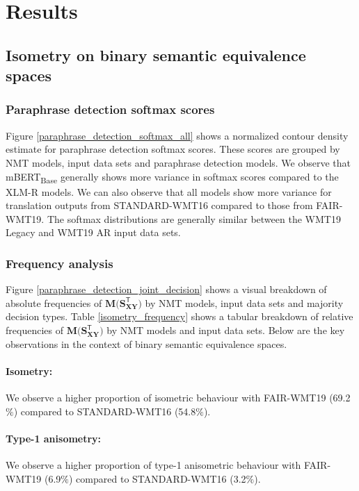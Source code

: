 \documentclass[11pt,a4paper]{article}
\begin{document}
\section{Results}

\subsection{Isometry on binary semantic equivalence spaces}

\subsubsection{Paraphrase detection softmax scores}

Figure \ref{paraphrase_detection_softmax_all} shows a normalized contour density
estimate for paraphrase detection softmax scores. These scores are grouped by
NMT models, input data sets and paraphrase detection models. We observe that
mBERT\textsubscript{Base} generally shows more variance in softmax scores
compared to the XLM-R models. We can also observe that all models show more
variance for translation outputs from STANDARD-WMT16 compared to those from
FAIR-WMT19. The softmax distributions are generally similar between the WMT19
Legacy and WMT19 AR input data sets.

\subsubsection{Frequency analysis}

Figure \ref{paraphrase_detection_joint_decision} shows a visual breakdown of
absolute frequencies of $\mathbf{M(S_{XY}^{\mathsf{T}}})$ by NMT models, input
data sets and majority decision types. Table \ref{isometry_frequency} shows a
tabular breakdown of relative frequencies of $\mathbf{M(S_{XY}^{\mathsf{T}}})$
by NMT models and input data sets. Below are the key observations in the context
of binary semantic equivalence spaces.

\paragraph{Isometry:} We observe a higher proportion of isometric behaviour with
FAIR-WMT19 (69.2$\%$) compared to STANDARD-WMT16 (54.8$\%$).
\paragraph{Type-1 anisometry:} We observe a higher proportion of type-1
anisometric behaviour with FAIR-WMT19 (6.9$\%$) compared to STANDARD-WMT16
(3.2$\%$).
\end{document}
